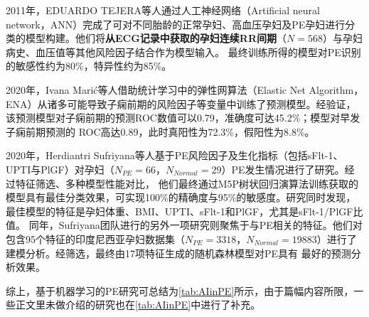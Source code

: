 2011年，EDUARDO TEJERA等人\cite{Tejera2011}通过人工神经网络（Artificial neural network，ANN）完成了可对不同胎龄的正常孕妇、高血压孕妇及PE孕妇进行分类的模型构建。他们将\textbf{从ECG记录中获取的孕妇连续RR间期}（$N=568$）与孕妇病史、血压值等其他风险因子结合作为模型输入。
最终训练所得的模型对PE识别的敏感性约为80\%，特异性约为85\%。

2020年，Ivana Mari{\'{c}}\cite{Maric2020}等人借助统计学习中的弹性网算法（Elastic Net Algorithm，ENA）从诸多可能导致子痫前期的风险因子等变量中训练了预测模型。经验证，该预测模型对子痫前期的预测ROC数值可以0.79，准确度可达45.2\%；模型对早发子痫前期预测的
ROC高达0.89，此时真阳性为72.3\%，假阳性为8.8\%。

2020年，Herdiantri Sufriyana等人\cite{Sufriyana2020-1}基于PE风险因子及生化指标（包括sFlt-1、UPTI与PlGF）对孕妇（$N_{PE}=66$，$N_{Normal}=29$）PE发生情况进行了研究。经过特征筛选、多种模型性能对比，
他们最终通过M5P树状回归演算法训练获取的模型具有最佳分类效果，可实现100\%的精确度与95\%的敏感度。研究同时发现，最佳模型的特征是孕妇体重、BMI、UPTI、sFlt-1和PlGF，尤其是sFlt-1/PlGF比值。
同年，Sufriyana团队进行的另外一项研究\cite{Sufriyana2020}则聚焦于与PE相关的特征。他们对包含95个特征的印度尼西亚孕妇数据集（$N_{PE}=3318$，$N_{Normal}=19883$）进行了建模分析。经筛选，最终由17项特征生成的随机森林模型对PE具有
最好的预测分析效果。

综上，基于机器学习的PE研究可总结为\autoref{tab:AIinPE}所示，由于篇幅内容所限，一些正文里未做介绍的研究也在\autoref{tab:AIinPE}中进行了补充。

